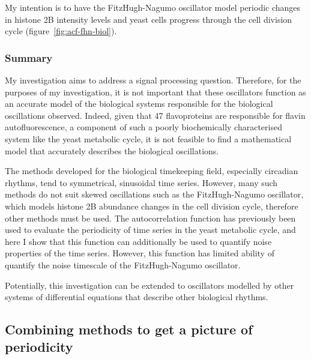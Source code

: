My intention is to have the FitzHugh-Nagumo oscillator model periodic changes in histone 2B intensity levels and yeast cells progress through the cell division cycle (figure~\ref{fig:acf-fhn-biol}).

\subsubsection{Summary}
\label{subsubsec:analysis-characterisation-acf-summary}

My investigation aims to address a signal processing question.
Therefore, for the purposes of my investigation, it is not important that these oscillators function as an accurate model of the biological systems responsible for the biological oscillations observed.
Indeed, given that 47 flavoproteins are responsible for flavin autofluorescence, a component of such a poorly biochemically characterised system like the yeast metabolic cycle, it is not feasible to find a mathematical model that accurately describes the biological oscillations.

The methods developed for the biological timekeeping field, especially circadian rhythms, tend to symmetrical, sinusoidal time series.
However, many such methods do not suit skewed oscillations such as the FitzHugh-Nagumo oscillator, which models histone 2B abundance changes in the cell division cycle, therefore other methods must be used.
The autocorrelation function has previously been used to evaluate the periodicity of time series in the yeast metabolic cycle, and here I show that this function can additionally be used to quantify noise properties of the time series.
However, this function has limited ability of quantify the noise timescale of the FitzHugh-Nagumo oscillator.

Potentially, this investigation can be extended to oscillators modelled by other systems of differential equations that describe other biological rhythms.

\subsection{Combining methods to get a picture of periodicity}
\label{subsec:analysis-characterisation-combined}

